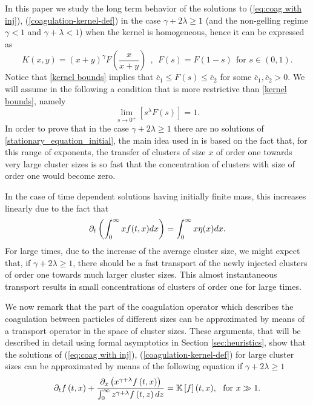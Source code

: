 \documentclass[11pt]{article}
\numberwithin{equation}{section}
\theoremstyle{plain}
\newcommand{\der}{\textup{d}}
\begin{document}
In this paper we study the long term behavior of the
solutions to (\ref{eq:coag with inj}), (\ref{coagulation-kernel-def}) in the case $\gamma + 2 \lambda \geq 1 $ (and the non-gelling regime $\gamma < 1 $ and $\gamma + \lambda < 1$) when the kernel is homogeneous, hence it can be expressed as 
\begin{equation}
K\left(  x,y\right)  =\left(  x+y\right)  ^{\gamma} F \left(  \frac{x}%
{x+y}\right)  \ \ ,\ \ F \left(  s\right)  =F\left(  1-s\right)
\ \ \text{for }s\in\left(  0,1\right).  \label{KernPhi}%
\end{equation}%
Notice that \eqref{kernel bounds} implies that
$\overline c_1 \leq F(s) \leq \overline c_2 $
for some $\overline c_1 , \overline c_2 >0$.
We will assume in the following a condition that is more restrictive than \eqref{kernel bounds}, namely 
\begin{equation}
\lim_{s\rightarrow0^{+}}\left[  s^{\lambda}F \left(  s\right)  \right]  =1. 
\label{PhiAsymp}%
\end{equation}
In order to prove that in the case $\gamma + 2 \lambda \geq 1$ there are no solutions of \eqref{stationary_equation_initial}, the main idea used in  \cite{ferreira2019stationary} is based on the fact that, for this range of exponents, the transfer of clusters
of size $x$ of order one towards very large cluster sizes is so fast
that the concentration of clusters with size of order one would become zero.

In the case of time dependent solutions having initially finite mass, this
increases linearly due to the fact that
\[
\partial_t \left( \int_0^\infty x f(t, x) \der x \right) = \int_0^\infty x \eta(x) \der x .
\] 
For large times, due to the
increase of the average cluster size, we might expect that, if $\gamma
+2\lambda\geq1$, there should be a fast transport of the newly injected
clusters of order one towards much larger cluster sizes. This almost instantaneous transport
results in small concentrations of clusters of order one for large times.

We now remark that the part of the coagulation operator
which describes the coagulation between particles of different sizes can be
approximated by means of a transport operator in the space of cluster sizes.
These arguments, that will be described in detail using formal asymptotics in
Section \ref{sec:heuristics}, show that the solutions of
(\ref{eq:coag with inj}), (\ref{coagulation-kernel-def}) for large cluster sizes can be
approximated by means of the following equation if $\gamma+2\lambda\geq
1$
\begin{equation}
\partial_{t}f\left(  t,x\right)  +\frac{\partial_{x}\left(  x^{\gamma+\lambda
}f\left(  t,x\right)  \right)  }{\int_{0}^{\infty}z^{\gamma+\lambda}f\left(
t,z\right) \der z}=\mathbb{K}\left[  f\right]  (t,x),\ \ \text{for }x\gg1.
\label{coagTransp}%
\end{equation}
\end{document}
